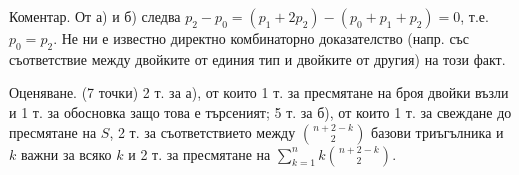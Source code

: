 Коментар. От а) и б) следва $p_2-p_0=(p_1+2p_2)-(p_0+p_1+p_2)=0$, т.е. $p_0=p_2$. Не ни е известно директно комбинаторно доказателство (напр. със съответствие между двойките от единия тип и двойките от другия) на този факт.

Оценяване. (7 точки) 2 т. за а), от които 1 т. за пресмятане на броя двойки възли и 1 т. за обосновка защо това е търсеният; 5 т. за б), от които 1 т. за свеждане до пресмятане на $S$, 2 т. за съответствието между $\binom{n+2-k}{2}$ базови триъгълника и $k$ важни за всяко $k$ и 2 т. за пресмятане на $\sum_{k=1}^n k\binom{n+2-k}{2}$.
